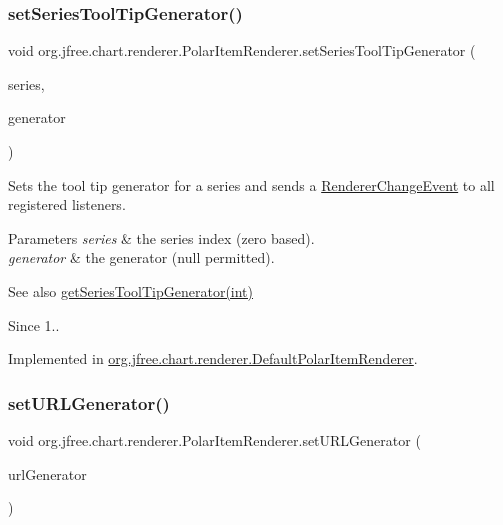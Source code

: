 \subsubsection{\texorpdfstring{set\+Series\+Tool\+Tip\+Generator()}{setSeriesToolTipGenerator()}}
{\footnotesize\ttfamily void org.\+jfree.\+chart.\+renderer.\+Polar\+Item\+Renderer.\+set\+Series\+Tool\+Tip\+Generator (\begin{DoxyParamCaption}\item[{int}]{series,  }\item[{\mbox{\hyperlink{interfaceorg_1_1jfree_1_1chart_1_1labels_1_1_x_y_tool_tip_generator}{X\+Y\+Tool\+Tip\+Generator}}}]{generator }\end{DoxyParamCaption})}

Sets the tool tip generator for a series and sends a \mbox{\hyperlink{}{Renderer\+Change\+Event}} to all registered listeners.


\begin{DoxyParams}{Parameters}
{\em series} & the series index (zero based). \\
\hline
{\em generator} & the generator ({\ttfamily null} permitted).\\
\hline
\end{DoxyParams}
\begin{DoxySeeAlso}{See also}
\mbox{\hyperlink{interfaceorg_1_1jfree_1_1chart_1_1renderer_1_1_polar_item_renderer_a88c82899310074e147185e59d46060b2}{get\+Series\+Tool\+Tip\+Generator(int)}}
\end{DoxySeeAlso}
\begin{DoxySince}{Since}
1.. 
\end{DoxySince}


Implemented in \mbox{\hyperlink{classorg_1_1jfree_1_1chart_1_1renderer_1_1_default_polar_item_renderer_afd59a9fcaf9f825b6c86f04a29e9204d}{org.\+jfree.\+chart.\+renderer.\+Default\+Polar\+Item\+Renderer}}.

\mbox{\label{interfaceorg_1_1jfree_1_1chart_1_1renderer_1_1_polar_item_renderer_a8809317358c46f995ce56e79857ff96e}} 
\subsubsection{\texorpdfstring{set\+U\+R\+L\+Generator()}{setURLGenerator()}}
{\footnotesize\ttfamily void org.\+jfree.\+chart.\+renderer.\+Polar\+Item\+Renderer.\+set\+U\+R\+L\+Generator (\begin{DoxyParamCaption}\item[{\mbox{\hyperlink{interfaceorg_1_1jfree_1_1chart_1_1urls_1_1_x_y_u_r_l_generator}{X\+Y\+U\+R\+L\+Generator}}}]{url\+Generator }\end{DoxyParamCaption})}

